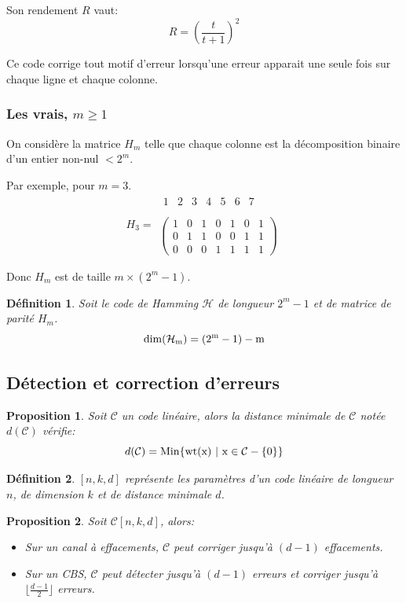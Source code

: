 \documentclass[a4paper,10pt,twocolumn]{article}
\theoremstyle{break}
\newtheorem{mydef}{Définition}
\newtheorem{myprop}{Proposition}
\begin{document}
Son rendement $R$ vaut:
$$R = \left(\frac{t}{t+1}\right)^2$$

Ce code corrige tout motif d'erreur lorsqu'une erreur apparait une seule fois sur chaque ligne et chaque colonne.

\subsubsection{Les \flqq vrais\frqq, $m \ge 1$}

On considère la matrice $H_m$ telle que chaque colonne est la décomposition binaire d'un entier non-nul $< 2^m$.

Par exemple, pour $m = 3$.
$$
H_3 = 
\begin{array}{c}
\begin{array}{ccccccc}
1 & 2 & 3 & 4 & 5 & 6 & 7 \\
\end{array}\\
\left(
\begin{array}{ccccccc}
 1 & 0 & 1 & 0 & 1 & 0 & 1 \\
 0 & 1 & 1 & 0 & 0 & 1 & 1 \\
 0 & 0 & 0 & 1 & 1 & 1 & 1 
\end{array}
\right)
\end{array}
$$

Donc $H_m$ est de taille $m \times (2^m - 1)$.

\begin{mydef}
 Soit le code de Hamming $\mathcal{H}$ de longueur $2^m-1$ et de matrice de parité $H_m$.
 $$\rm{dim}(\mathcal{H}_m) = (2^m - 1) - m$$
\end{mydef}

\subsection{Détection et correction d'erreurs}
\begin{myprop}
 Soit $\mathcal{C}$ un code linéaire, alors la distance minimale de $\mathcal{C}$ notée $d(\mathcal{C})$ vérifie:
 $$ d(\mathcal{C}) = \rm{Min} \lbrace wt(x) \ |\  x \in \mathcal{C} - \lbrace 0 \rbrace \rbrace$$
\end{myprop}

\begin{mydef}
 $[n,k,d]$ représente les paramètres d'un code linéaire de longueur $n$, de dimension $k$ et de distance minimale $d$.
\end{mydef}

\begin{myprop}
 Soit $\mathcal{C}[n,k,d]$, alors:
\begin{itemize}
 \item Sur un canal à effacements, $\mathcal{C}$ peut corriger jusqu'à $(d-1)$ effacements.
 \item Sur un CBS, $\mathcal{C}$ peut détecter jusqu'à $(d-1)$ erreurs et corriger jusqu'à $\lfloor\frac{d-1}{2}\rfloor$ erreurs.
\end{itemize}
\end{myprop}
\end{document}
